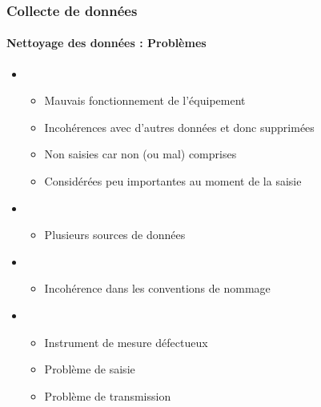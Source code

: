 \documentclass[xcolor=table]{beamer}
\begin{document}
\begin{frame}
	\frametitle{Collecte de données}
	\framesubtitle{Nettoyage des données : Problèmes}
	
	\begin{itemize}
		\item {}
		\begin{itemize}
			\item Mauvais fonctionnement de l'équipement
			\item Incohérences avec d'autres données et donc supprimées
			\item Non saisies car non (ou mal) comprises
			\item Considérées peu importantes au moment de la saisie
		\end{itemize}
		\item {}
		\begin{itemize}
			\item Plusieurs sources de données
		\end{itemize}
		\item {}
		\begin{itemize}
			\item Incohérence dans les conventions de nommage
		\end{itemize}
		\item {}
		\begin{itemize}
			\item Instrument de mesure défectueux
			\item Problème de saisie
			\item Problème de transmission
		\end{itemize}
	\end{itemize}
	
\end{frame}
\end{document}
